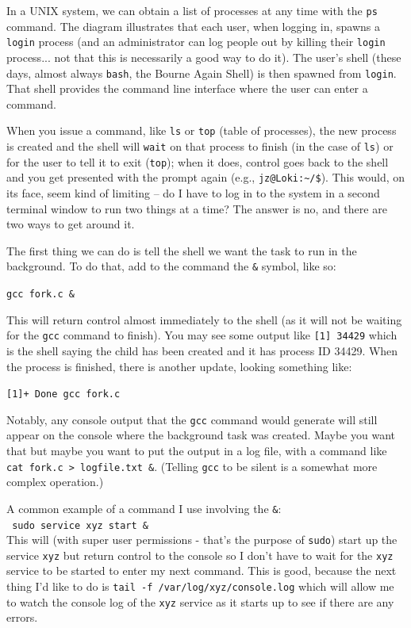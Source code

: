 \documentclass[a4paper]{report}
\begin{document}
In a UNIX system, we can obtain a list of processes at any time with the \texttt{ps} command. The diagram illustrates that each user, when logging in, spawns a \texttt{login} process (and an administrator can log people out by killing their \texttt{login} process... not that this is necessarily a good way to do it). The user's shell (these days, almost always \texttt{bash}, the Bourne Again Shell) is then spawned from \texttt{login}. That shell provides the command line interface where the user can enter a command.

When you issue a command, like \texttt{ls} or \texttt{top} (table of processes), the new process is created and the shell will \texttt{wait} on that process to finish (in the case of \texttt{ls}) or for the user to tell it to exit (\texttt{top}); when it does, control goes back to the shell and you get presented with the prompt again (e.g., \texttt{jz@Loki:\~{}/\$}). This would, on its face, seem kind of limiting -- do I have to log in to the system in a second terminal window to run two things at a time? The answer is no, and there are two ways to get around it.

The first thing we can do is tell the shell we want the task to run in the background. To do that, add to the command the \texttt{\&} symbol, like so:

\texttt{gcc fork.c \&}

This will return control almost immediately to the shell (as it will not be waiting for the \texttt{gcc} command to finish). You may see some output like \texttt{[1] 34429} which is the shell saying the child has been created and it has process ID 34429. When the process is finished, there is another update, looking something like:

\texttt{[1]+  Done                    gcc fork.c}

Notably, any console output that the \texttt{gcc} command would generate will still appear on the console where the background task was created. Maybe you want that but maybe you want to put the output in a log file, with a command like \texttt{cat fork.c > logfile.txt \&}. (Telling \texttt{gcc} to be silent is a somewhat more complex operation.)

A common example of a command I use involving the \texttt{\&}:\\
\texttt{ sudo service xyz start \& }\\
This will (with super user permissions - that's the purpose of \texttt{sudo}) start up the service \texttt{xyz} but return control to the console so I don't have to wait for the \texttt{xyz} service to be started to enter my next command. This is good, because the next thing I'd like to do is \texttt{tail -f /var/log/xyz/console.log} which will allow me to watch the console log of the \texttt{xyz} service as it starts up to see if there are any errors.
\end{document}
